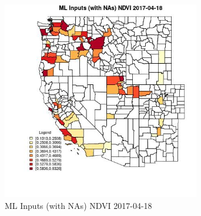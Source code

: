 \begin{figure} 
\centering  
\includegraphics[width=0.77\textwidth]{Code_Outputs/Report_ML_input_PM25_Step4_part_f_de_duplicated_aves_prioritize_24hr_obswNAs_CountyNDVIMean2017-04-18.jpg} 
\caption{\label{fig:Report_ML_input_PM25_Step4_part_f_de_duplicated_aves_prioritize_24hr_obswNAsCountyNDVIMean2017-04-18}ML Inputs (with NAs) NDVI 2017-04-18} 
\end{figure} 
 
